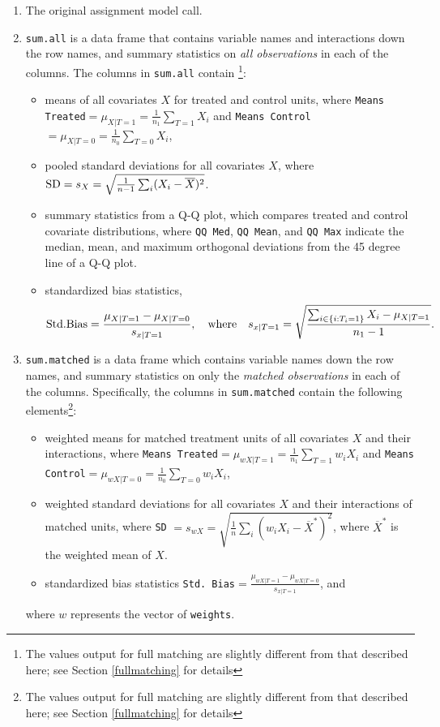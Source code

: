 \documentclass[oneside,letterpaper,titlepage]{article}
\begin{document}
\begin{enumerate}
\item The original assignment model call.
\item \texttt{sum.all} is a data frame that contains variable names
  and interactions down the row names, and summary statistics on
  \emph{all observations} in each of the columns.  The columns in
  \texttt{sum.all} contain \footnote{The values output for full
    matching are slightly different from that described here; see
    Section \ref{fullmatching} for details}:
  \begin{itemize}
  \item means of all covariates $X$ for treated and control units,
    where \texttt{Means Treated}$= \mu_{X|T=1} = \frac{1}{n_1}
    \sum_{T=1} X_i$ and \texttt{Means Control}$= \mu_{X|T=0} =
    \frac{1}{n_0} \sum_{T=0} X_i$,
  \item pooled standard deviations for all covariates $X$, where ${\rm
      SD} = s_X = \sqrt{\frac{1}{n-1} \sum_{i} (X_i -
      \overline{X})^2}$.
  \item summary statistics from a Q-Q plot, which compares treated and
    control covariate distributions, where \texttt{QQ Med}, \texttt{QQ
      Mean}, and \texttt{QQ Max} indicate the median, mean, and
    maximum orthogonal deviations from the 45 degree line of a Q-Q
    plot.
  \item standardized bias statistics, $${\rm Std.
      Bias}=\frac{\mu_{X|T=1} - \mu_{X|T=0}}{s_{x|T=1}}, \quad {\rm
      where} \quad s_{x|T=1} = \sqrt{\frac{\sum_{i \in \{i: T_i=1\}}
        X_i - \mu_{X|T=1}}{n_1-1} }.$$
  \end{itemize}
  
\item \texttt{sum.matched} is a data frame which contains variable
  names down the row names, and summary statistics on only the
  \emph{matched observations} in each of the columns.  Specifically,
  the columns in \texttt{sum.matched} contain the following
  elements\footnote{The values output for full matching are slightly
    different from that described here; see Section \ref{fullmatching}
    for details}:
  \begin{itemize}
  \item weighted means for matched treatment units of all covariates
    $X$ and their interactions, where \texttt{Means Treated}$=
    \mu_{wX|T=1} = \frac{1}{n_1} \sum_{T=1} w_iX_i$ and \texttt{Means
      Control}$=\mu_{wX|T=0} = \frac{1}{n_0} \sum_{T=0} w_iX_i$,
  \item weighted standard deviations for all covariates $X$ and their
    interactions of matched units, where \texttt{SD} $= s_{wX} =
    \sqrt{\frac{1}{n} \sum_{i} (w_iX_i - \overline{X}^*)^2}$, where
    $\overline{X}^*$ is the weighted mean of $X$.
  \item standardized bias statistics \texttt{Std.
      Bias}$=\frac{\mu_{wX|T=1} - \mu_{wX|T=0}}{s_{x|T=1}}$, and
  \end{itemize}
  where $w$ represents the vector of \texttt{weights}.
  

\end{enumerate}
\end{document}
